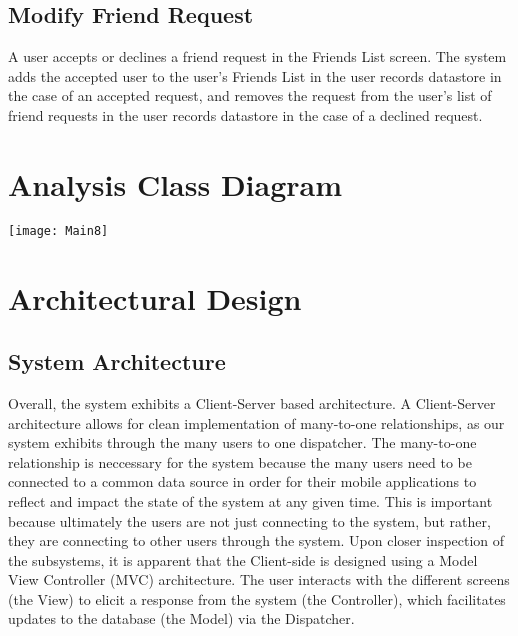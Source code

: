 \documentclass[english]{article}
\begin{document}
\subsection{Modify Friend Request}
A user accepts or declines a friend request in the Friends List screen. The system adds the accepted user to the user's Friends List in the user records datastore in the case of an accepted request, and removes the request from the user's list of friend requests in the user records datastore in the case of a declined request.


\section{Analysis Class Diagram}
\label{sec:analysis_class_diagram}
\texttt{[image: Main8]}


\section{Architectural Design}
\label{sec:architectural_design}

\subsection{System Architecture}
\label{sub:system_architecture}
    
Overall, the system exhibits a Client-Server based architecture. A Client-Server architecture allows for clean implementation of many-to-one relationships, as our system exhibits through the many users to one dispatcher. The many-to-one relationship is neccessary for the system because the many users need to be connected to a common data source in order for their mobile applications to reflect and impact the state of the system at any given time. This is important because ultimately the users are not just connecting to the system, but rather, they are connecting to other users through the system. 
\newline
\newline
Upon closer inspection of the subsystems, it is apparent that the Client-side is designed using a Model View Controller (MVC) architecture. The user interacts with the different screens (the View) to elicit a response from the system (the Controller), which facilitates updates to the database (the Model) via the Dispatcher.
\\
\end{document}
